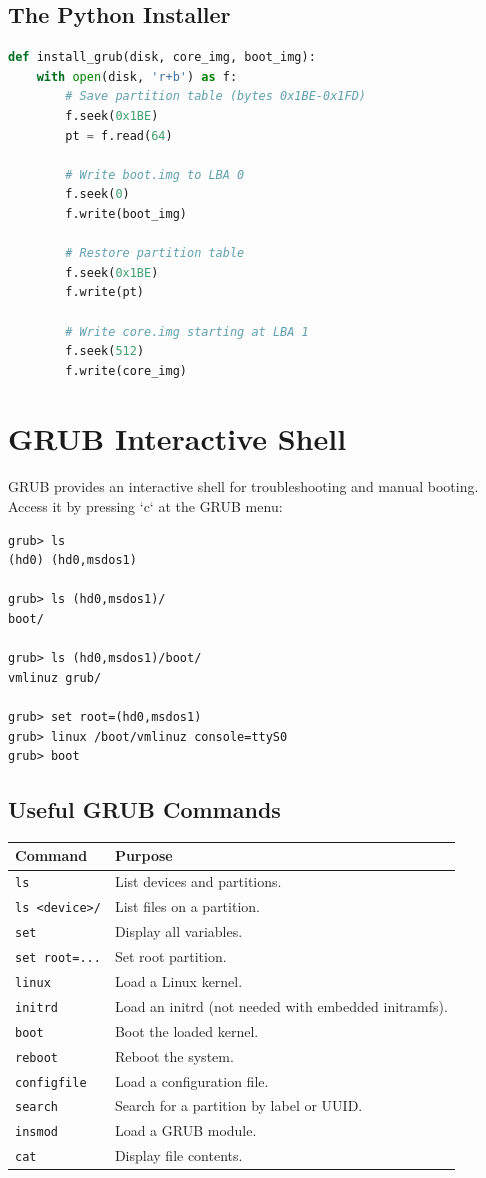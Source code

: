 \subsection{The Python Installer}

\begin{lstlisting}[language=python]
def install_grub(disk, core_img, boot_img):
    with open(disk, 'r+b') as f:
        # Save partition table (bytes 0x1BE-0x1FD)
        f.seek(0x1BE)
        pt = f.read(64)

        # Write boot.img to LBA 0
        f.seek(0)
        f.write(boot_img)

        # Restore partition table
        f.seek(0x1BE)
        f.write(pt)

        # Write core.img starting at LBA 1
        f.seek(512)
        f.write(core_img)
\end{lstlisting}

\section{GRUB Interactive Shell}

GRUB provides an interactive shell for troubleshooting and manual booting.
Access it by pressing `c` at the GRUB menu:

\begin{lstlisting}
grub> ls
(hd0) (hd0,msdos1)

grub> ls (hd0,msdos1)/
boot/

grub> ls (hd0,msdos1)/boot/
vmlinuz grub/

grub> set root=(hd0,msdos1)
grub> linux /boot/vmlinuz console=ttyS0
grub> boot
\end{lstlisting}

\subsection{Useful GRUB Commands}

\begin{longtable}{|p{3cm}|p{10cm}|}
\hline
\textbf{Command} & \textbf{Purpose} \\
\hline
\texttt{ls} & List devices and partitions. \\
\texttt{ls \textless device\textgreater/} & List files on a partition. \\
\texttt{set} & Display all variables. \\
\texttt{set root=...} & Set root partition. \\
\texttt{linux} & Load a Linux kernel. \\
\texttt{initrd} & Load an initrd (not needed with embedded initramfs). \\
\texttt{boot} & Boot the loaded kernel. \\
\texttt{reboot} & Reboot the system. \\
\texttt{configfile} & Load a configuration file. \\
\texttt{search} & Search for a partition by label or UUID. \\
\texttt{insmod} & Load a GRUB module. \\
\texttt{cat} & Display file contents. \\
\hline
\end{longtable}

